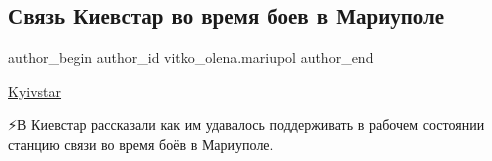  
 
 
 
 

\subsection{Связь Киевстар во время боев в Мариуполе}
\label{sec:26_11_2022.fb.vitko_olena.mariupol.1.svyaz_kievstar_vo_vr}

\ifcmt
 author_begin
   author_id vitko_olena.mariupol
 author_end
\fi

\href{https://www.facebook.com/kyivstar/}{Kyivstar}

⚡️В Киевстар рассказали как им удавалось поддерживать в рабочем состоянии
станцию связи во время боёв в Мариуполе.

